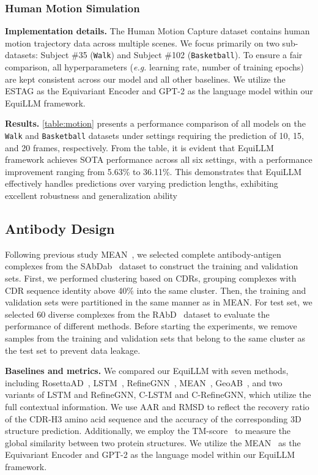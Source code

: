 \subsubsection{Human Motion Simulation}



\textbf{Implementation details.}
The Human Motion Capture dataset contains human motion trajectory data across multiple scenes. We focus primarily on two sub-datasets: Subject \#35 (\texttt{Walk}) and Subject \#102 (\texttt{Basketball}). To ensure a fair comparison, all hyperparameters (\emph{e.g.} learning rate, number of training epochs) are kept consistent across our model and all other baselines. We utilize the ESTAG as the Equivariant Encoder and GPT-2 as the language model within our EquiLLM framework.

\textbf{Results.}
\cref{table:motion} presents a performance comparison of all models on the \texttt{Walk} and \texttt{Basketball} datasets under settings requiring the prediction of 10, 15, and 20 frames, respectively. From the table, it is evident that EquiLLM framework achieves SOTA performance across all six settings, with a performance improvement ranging from 5.63\% to 36.11\%. This demonstrates that EquiLLM effectively handles predictions over varying prediction lengths, exhibiting excellent robustness and generalization ability

\subsection{Antibody Design}
\label{sec:4.2}
Following previous study MEAN~\citep{kong2022conditional}, we selected complete antibody-antigen complexes from the SAbDab~\citep{dunbar2014sabdab} dataset to construct the training and validation sets. First, we performed clustering based on CDRs, grouping complexes with CDR sequence identity above 40\% into the same cluster. Then, the training and validation sets were partitioned in the same manner as in MEAN. For test set, we selected 60 diverse complexes from the RAbD~\citep{adolf2018rosettaantibodydesign} dataset to evaluate the performance of different methods. Before starting the experiments, we remove samples from the training and validation sets that belong to the same cluster as the test set to prevent data leakage.


\textbf{Baselines and metrics.}
We compared our EquiLLM with seven methods, including RosettaAD~\citep{adolf2018rosettaantibodydesign}, LSTM~\citep{saka2021antibody, akbar2022silico}, RefineGNN~\citep{jin2022iterative}, MEAN~\citep{kong2022conditional}, GeoAB~\citep{lin2024geoab}, and two variants of LSTM and RefineGNN, C-LSTM and C-RefineGNN, which utilize the full contextual information. We use AAR and RMSD to reflect the recovery ratio of the CDR-H3 amino acid sequence and the accuracy of the corresponding 3D structure prediction. Additionally, we employ the TM-score~\citep{zhang2004scoring, xu2010significant} to measure the global similarity between two protein structures. We utilize the MEAN~\citep{kong2022conditional} as the Equivariant Encoder and GPT-2 as the language model within our EquiLLM framework. 



